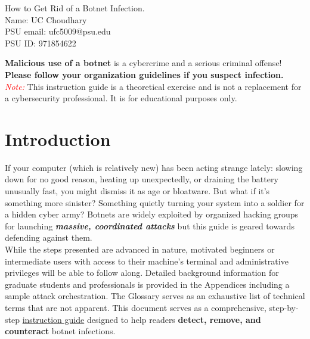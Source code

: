 \documentclass{article}
\newcommand{\titlefont}{\fontfamily{ppl}\selectfont}
\begin{document}
\begin{titlepage}
  \vspace*{160pt}
  \begin{center}
    {\titlefont \Huge How to Get Rid of a Botnet Infection.}\\[1cm]
    {\LARGE Name: UC Choudhary\\[1cm]}
    {\LARGE PSU email: ufc5009@psu.edu\\[1cm]}
    {\LARGE PSU ID: 971854622\\[1cm]}
  \end{center}
  \thispagestyle{fancy}
  \vspace*{\fill}
\end{titlepage}

\tableofcontents
\newpage

\begin{tcolorbox}[
  colback=backcolour,
  colframe=red!75!black,
  title={Disclaimer},
  fonttitle=\bfseries\large\centering,
  arc=4mm,
  boxrule=1pt,
  left=10pt, right=10pt,
  top=10pt, bottom=10pt,
  enhanced
]
\textbf{Malicious use of a botnet} is a cybercrime and a serious criminal offense!\\[2mm]
\textbf{Please follow your organization guidelines if you suspect infection.} \\[2mm]
\textit{\textcolor{red}{Note:}} This instruction guide is a theoretical exercise and is not a replacement for a cybersecurity professional.
It is for educational purposes only.
\end{tcolorbox}

\section{Introduction}
\noindent If your computer (which is relatively new) has been acting strange lately: slowing down for no good reason, heating up unexpectedly, or draining the battery unusually fast, you might dismiss it as age or bloatware. But what if it's something more sinister? Something quietly turning your system into a soldier for a hidden cyber army?
\noindent Botnets are widely exploited by organized hacking groups for launching \textbf{\textit{massive, coordinated attacks}} but this guide is geared towards defending against them.\\
While the steps presented are advanced in nature, motivated beginners or intermediate users with access to their machine's terminal and administrative privileges will be able to follow along. Detailed background information for graduate students and professionals is provided in the Appendices including a sample attack orchestration. The Glossary serves as an exhaustive list of technical terms that are not apparent. This document serves as a comprehensive, step-by-step \underline{instruction guide} designed to help readers \textbf{detect, remove, and counteract} botnet infections. 
\end{document}
